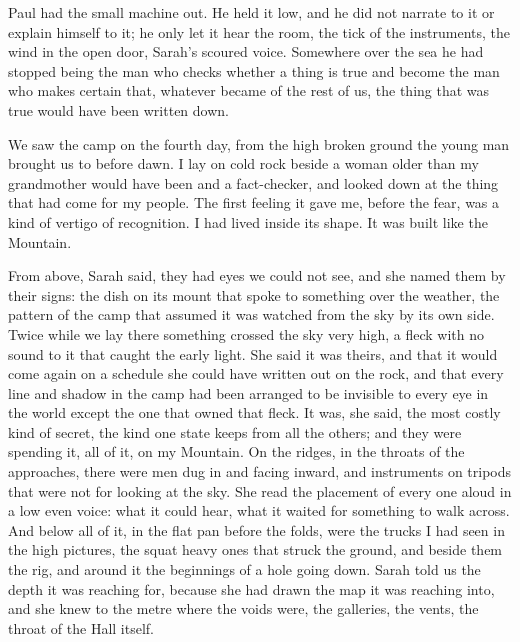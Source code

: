 Paul had the small machine out. He held it low, and he did not narrate to it or explain himself to it; he only let it hear the room, the tick of the instruments, the wind in the open door, Sarah's scoured voice. Somewhere over the sea he had stopped being the man who checks whether a thing is true and become the man who makes certain that, whatever became of the rest of us, the thing that was true would have been written down.\par

\ornament

We saw the camp on the fourth day, from the high broken ground the young man brought us to before dawn. I lay on cold rock beside a woman older than my grandmother would have been and a fact-checker, and looked down at the thing that had come for my people. The first feeling it gave me, before the fear, was a kind of vertigo of recognition. I had lived inside its shape. It was built like the Mountain.\par

From above, Sarah said, they had eyes we could not see, and she named them by their signs: the dish on its mount that spoke to something over the weather, the pattern of the camp that assumed it was watched from the sky by its own side. Twice while we lay there something crossed the sky very high, a fleck with no sound to it that caught the early light. She said it was theirs, and that it would come again on a schedule she could have written out on the rock, and that every line and shadow in the camp had been arranged to be invisible to every eye in the world except the one that owned that fleck. It was, she said, the most costly kind of secret, the kind one state keeps from all the others; and they were spending it, all of it, on my Mountain. On the ridges, in the throats of the approaches, there were men dug in and facing inward, and instruments on tripods that were not for looking at the sky. She read the placement of every one aloud in a low even voice: what it could hear, what it waited for something to walk across. And below all of it, in the flat pan before the folds, were the trucks I had seen in the high pictures, the squat heavy ones that struck the ground, and beside them the rig, and around it the beginnings of a hole going down. Sarah told us the depth it was reaching for, because she had drawn the map it was reaching into, and she knew to the metre where the voids were, the galleries, the vents, the throat of the Hall itself.\par

